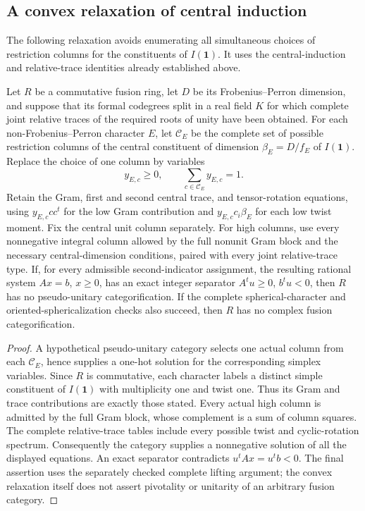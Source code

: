 \subsection{A convex relaxation of central induction}
\label{subsec:m3-convex-induction}
The following relaxation avoids enumerating all simultaneous choices of
restriction columns for the constituents of $I(\mathbf1)$. It uses the
central-induction and relative-trace identities already established above.
\begin{proposition}
Let $R$ be a commutative fusion ring, let $D$ be its Frobenius--Perron
dimension, and suppose that its formal codegrees split in a real field $K$
for which complete joint relative traces of the required roots of unity
have been obtained. For each non-Frobenius--Perron character $E$, let
$\mathcal C_E$ be the complete set of possible restriction columns of the
central constituent of dimension $\beta_E=D/f_E$ of $I(\mathbf1)$.
Replace the choice of one column by variables
\[
 y_{E,c}\geq0,\qquad \sum_{c\in\mathcal C_E}y_{E,c}=1.
\]
Retain the Gram, first and second central trace, and tensor-rotation
equations, using $y_{E,c}cc^t$ for the low Gram contribution and
$y_{E,c}c_i\beta_E$ for each low twist moment. Fix the central unit column
separately. For high columns, use every nonnegative integral column
allowed by the full nonunit Gram block and the necessary central-dimension
conditions, paired with every joint relative-trace type.
If, for every admissible second-indicator assignment, the resulting
rational system $Ax=b$, $x\geq0$, has an exact integer separator
$A^tu\geq0$, $b^tu<0$, then $R$ has no pseudo-unitary categorification.
If the complete spherical-character and oriented-sphericalization checks
also succeed, then $R$ has no complex fusion categorification.
\end{proposition}
\begin{proof}
A hypothetical pseudo-unitary category selects one actual column from
each $\mathcal C_E$, hence supplies a one-hot solution for the corresponding
simplex variables. Since $R$ is commutative, each character labels a
distinct simple constituent of $I(\mathbf1)$ with multiplicity one and
twist one. Thus its Gram and trace contributions are exactly those stated.
Every actual high column is admitted by the full Gram block, whose
complement is a sum of column squares. The complete relative-trace tables
include every possible twist and cyclic-rotation spectrum. Consequently
the category supplies a nonnegative solution of all the displayed
equations. An exact separator contradicts $u^tAx=u^tb<0$.
The final assertion uses the separately checked complete lifting argument;
the convex relaxation itself does not assert pivotality or unitarity of an
arbitrary fusion category.
\end{proof}
